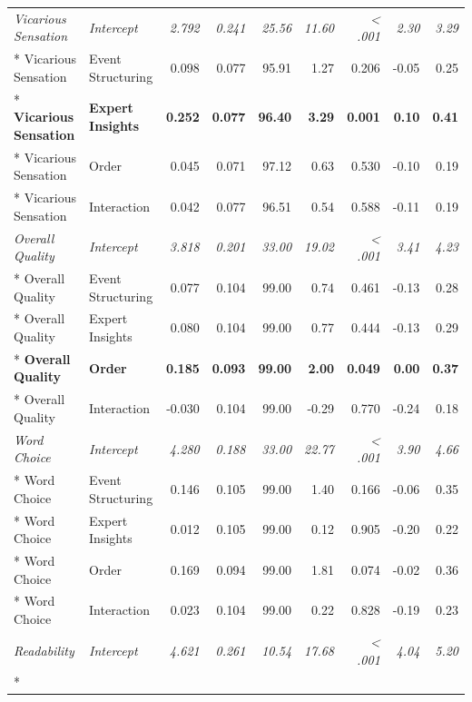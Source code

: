\begin{longtable}{l l r r r r r r r}
  \addlinespace
  \textit{Vicarious Sensation} & \textit{Intercept} & \textit{2.792} & \textit{0.241} & \textit{25.56} & \textit{11.60} & \textit{< .001} & \textit{2.30} & \textit{3.29}\\*
  Vicarious Sensation & Event Structuring & 0.098 & 0.077 & 95.91 & 1.27 & 0.206 & -0.05 & 0.25\\*
  \textbf{Vicarious Sensation} & \textbf{Expert Insights} & \textbf{0.252} & \textbf{0.077} & \textbf{96.40} & \textbf{3.29} & \textbf{0.001} & \textbf{0.10} & \textbf{0.41}\\*
  Vicarious Sensation & Order & 0.045 & 0.071 & 97.12 & 0.63 & 0.530 & -0.10 & 0.19\\*
  Vicarious Sensation & Interaction & 0.042 & 0.077 & 96.51 & 0.54 & 0.588 & -0.11 & 0.19\\
  \addlinespace
  \textit{Overall Quality} & \textit{Intercept} & \textit{3.818} & \textit{0.201} & \textit{33.00} & \textit{19.02} & \textit{< .001} & \textit{3.41} & \textit{4.23}\\*
  Overall Quality & Event Structuring & 0.077 & 0.104 & 99.00 & 0.74 & 0.461 & -0.13 & 0.28\\*
  Overall Quality & Expert Insights & 0.080 & 0.104 & 99.00 & 0.77 & 0.444 & -0.13 & 0.29\\*
  \textbf{Overall Quality} & \textbf{Order} & \textbf{0.185} & \textbf{0.093} & \textbf{99.00} & \textbf{2.00} & \textbf{0.049} & \textbf{0.00} & \textbf{0.37}\\*
  Overall Quality & Interaction & -0.030 & 0.104 & 99.00 & -0.29 & 0.770 & -0.24 & 0.18\\
  \addlinespace
  \textit{Word Choice} & \textit{Intercept} & \textit{4.280} & \textit{0.188} & \textit{33.00} & \textit{22.77} & \textit{< .001} & \textit{3.90} & \textit{4.66}\\*
  Word Choice & Event Structuring & 0.146 & 0.105 & 99.00 & 1.40 & 0.166 & -0.06 & 0.35\\*
  Word Choice & Expert Insights & 0.012 & 0.105 & 99.00 & 0.12 & 0.905 & -0.20 & 0.22\\*
  Word Choice & Order & 0.169 & 0.094 & 99.00 & 1.81 & 0.074 & -0.02 & 0.36\\*
  Word Choice & Interaction & 0.023 & 0.104 & 99.00 & 0.22 & 0.828 & -0.19 & 0.23\\
  \addlinespace
  \textit{Readability} & \textit{Intercept} & \textit{4.621} & \textit{0.261} & \textit{10.54} & \textit{17.68} & \textit{< .001} & \textit{4.04} & \textit{5.20}\\*

\end{longtable}
